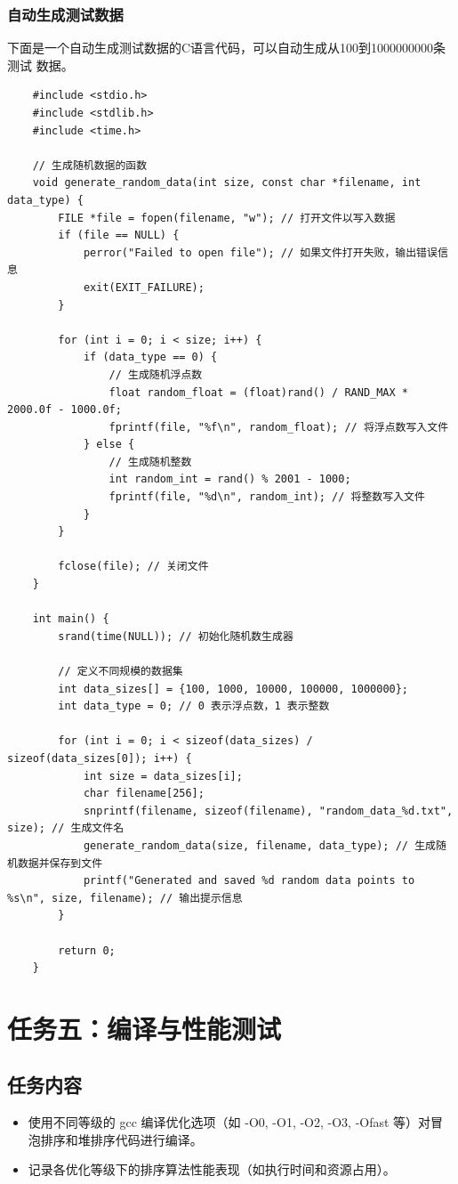 \documentclass[UTF8]{ctexart}
\begin{document}
\subsubsection{自动生成测试数据}
下面是一个自动生成测试数据的C语言代码，可以自动生成从100到1000000000条测试
数据。
\begin{lstlisting}
    #include <stdio.h>
    #include <stdlib.h>
    #include <time.h>
    
    // 生成随机数据的函数
    void generate_random_data(int size, const char *filename, int data_type) {
        FILE *file = fopen(filename, "w"); // 打开文件以写入数据
        if (file == NULL) {
            perror("Failed to open file"); // 如果文件打开失败，输出错误信息
            exit(EXIT_FAILURE);
        }
    
        for (int i = 0; i < size; i++) {
            if (data_type == 0) {
                // 生成随机浮点数
                float random_float = (float)rand() / RAND_MAX * 2000.0f - 1000.0f;
                fprintf(file, "%f\n", random_float); // 将浮点数写入文件
            } else {
                // 生成随机整数
                int random_int = rand() % 2001 - 1000;
                fprintf(file, "%d\n", random_int); // 将整数写入文件
            }
        }
    
        fclose(file); // 关闭文件
    }
    
    int main() {
        srand(time(NULL)); // 初始化随机数生成器
    
        // 定义不同规模的数据集
        int data_sizes[] = {100, 1000, 10000, 100000, 1000000};
        int data_type = 0; // 0 表示浮点数，1 表示整数
    
        for (int i = 0; i < sizeof(data_sizes) / sizeof(data_sizes[0]); i++) {
            int size = data_sizes[i];
            char filename[256];
            snprintf(filename, sizeof(filename), "random_data_%d.txt", size); // 生成文件名
            generate_random_data(size, filename, data_type); // 生成随机数据并保存到文件
            printf("Generated and saved %d random data points to %s\n", size, filename); // 输出提示信息
        }
    
        return 0;
    }
\end{lstlisting}


\section{任务五：编译与性能测试}
\subsection{任务内容}
\begin{itemize}
    \item 使用不同等级的 gcc 编译优化选项（如 -O0, -O1, -O2, -O3, -Ofast 等）对冒泡排序和堆排序代码进行编译。
    \item 记录各优化等级下的排序算法性能表现（如执行时间和资源占用）。
\end{itemize}
\end{document}
